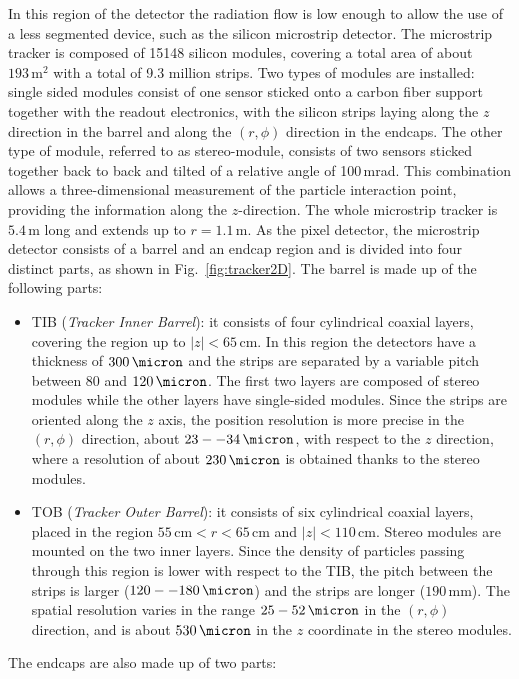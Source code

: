 In this region of the detector the radiation flow is low enough to allow the use of a less segmented device, such as the silicon microstrip detector.
The microstrip tracker is composed of 15148 silicon modules, covering a total area of about $193\,\mathrm{m^2}$ with a total of 9.3 million strips. Two types of modules are installed: single sided modules consist of one sensor sticked onto a carbon fiber support together with the readout electronics, with the silicon strips laying along the $z$ direction in the barrel and along the $(r,\phi)$ direction in the endcaps. The other type of module, referred to as stereo-module, consists of two sensors sticked together back to back and tilted of a relative angle of 100\,mrad. This combination allows a three-dimensional measurement of the particle interaction point, providing the information along the $z$-direction. The whole microstrip tracker is $5.4$\,m long and extends up to $r=1.1$\,m. As the pixel detector, the microstrip detector consists of a barrel and an endcap region and is divided into four distinct parts, as shown in Fig.~\ref{fig:tracker2D}. The barrel is made up of the following parts:
\begin{itemize}
\item TIB (\emph{Tracker Inner Barrel}): it consists of four cylindrical coaxial layers, covering the region up to $|z|<65$\,cm. In this region the detectors have a thickness of $300\,\micron$ and the strips are separated by a variable pitch between 80 and $120\,\micron$. The first two layers are composed of stereo modules while the other layers have single-sided modules. Since the strips are oriented along the $z$ axis, the position resolution is more precise in the $(r,\phi)$ direction, about $23 -- 34\,\micron$, with respect to the $z$ direction, where a resolution of about $230\,\micron$ is obtained thanks to the stereo modules.
\item TOB (\emph{Tracker Outer Barrel}): it consists of six cylindrical coaxial layers, placed in the region $55\,\mathrm{cm} < r < 65\,\mathrm{cm}$ and $|z|<110$\,cm. Stereo modules are mounted on the two inner layers. Since the density of particles passing through this region is lower with respect to the TIB, the pitch between the strips is larger ($120 -- 180\,\micron$) and the strips are longer ($190$\,mm). The spatial resolution varies in the range $25 - 52\,\micron$ in the $(r,\phi)$ direction, and is about $530\,\micron$ in the $z$ coordinate in the stereo modules.
\end{itemize}
The endcaps are also made up of two parts:

